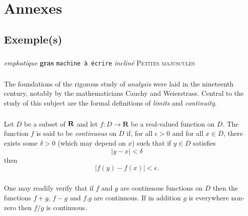 
\appendix{}

\chapter{Annexes}

    \section{Exemple(s)}

        \paragraph{}
            \emph{emphatique}
            \textbf{gras}
            \texttt{machine à écrire}
            \textsl{incliné}
            \textsc{Petites majuscules}

        \paragraph{}
            The foundations of the rigorous study of \emph{analysis}
            were laid in the nineteenth century, notably by the
            mathematicians Cauchy and Weierstrass. Central to the
            study of this subject are the formal definitions of
            \emph{limits} and \emph{continuity}.

        \paragraph{}
            Let $D$ be a subset of $\bf R$ and let
            $f \colon D \to \mathbf{R}$ be a real-valued function on
            $D$. The function $f$ is said to be \emph{continuous} on
            $D$ if, for all $\epsilon > 0$ and for all $x \in D$,
            there exists some $\delta > 0$ (which may depend on $x$)
            such that if $y \in D$ satisfies
            \[ |y - x| < \delta \]
            then
            \[ |f(y) - f(x)| < \epsilon. \]

        \paragraph{}
            One may readily verify that if $f$ and $g$ are continuous
            functions on $D$ then the functions $f+g$, $f-g$ and
            $f.g$ are continuous. If in addition $g$ is everywhere
            non-zero then $f/g$ is continuous.

    \clearpage


